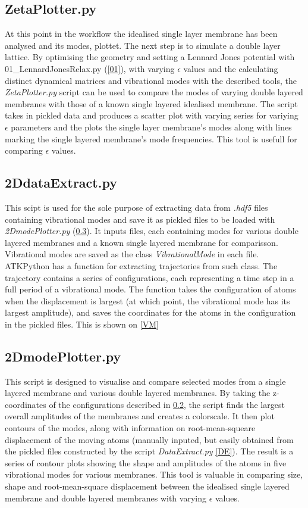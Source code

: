 \subsection{ZetaPlotter.py}
At this point in the workflow the idealised single layer membrane has been analysed and its modes, plottet. The next step is to simulate a double layer lattice. By optimising the geometry and setting a Lennard Jones potential with 01\_LennardJonesRelax.py (\cref{01}), with varying $\epsilon$ values and the calculating distinct dynamical matrices and vibrational modes with the described tools, the \textit{ZetaPlotter.py} script can be used to compare the modes of varying double layered membranes with those of a known single layered idealised membrane. The script takes in pickled data and produces a scatter plot with varying series for variying $\epsilon$ parameters and the plots the single layer membrane's modes along with lines marking the single layered membrane's mode frequencies. This tool is usefull for comparing $\epsilon$ values.
\subsection{2DdataExtract.py}\label{2DE}
This scipt is used for the sole purpose of extracting data from \textit{.hdf5} files containing vibrational modes and save it as pickled files to be loaded with \textit{2DmodePlotter.py} (\cref{2DMP}). It inputs files, each containing modes for various double layered membranes and a known single layered membrane for comparisson. Vibrational modes are saved as the class \textit{VibrationalMode} in each file. ATKPython has a function for extracting trajectories from such class. The trajectory contains a series of configurations, each representing a time step in a full period of a vibrational mode. The function takes the configuration of atoms when the displacement is largest (at which point, the vibrational mode has its largest amplitude), and saves the coordinates for the atoms in the configuration in the pickled files. This is shown on \cref{VM}
\subsection{2DmodePlotter.py}\label{2DMP}
This script is designed to visualise and compare selected modes from a single layered membrane and various double layered membranes. By taking the z-coordinates of the configurations described in \cref{2DE}, the script finds the largest overall amplitudes of the membranes and creates a colorscale. It then plot contours of the modes, along with information on root-mean-squeare displacement of the moving atoms (manually inputed, but easily obtained from the pickled files constructed by the script \textit{DataExtract.py} \cref{DE}). The result is a series of contour plots showing the shape and amplitudes of the atoms in five vibrational modes for various membranes. This tool is valuable in comparing size, shape and root-mean-square displacement between the idealised single layered membrane and double layered membranes with varying $\epsilon$ values.
\onecolumngrid

